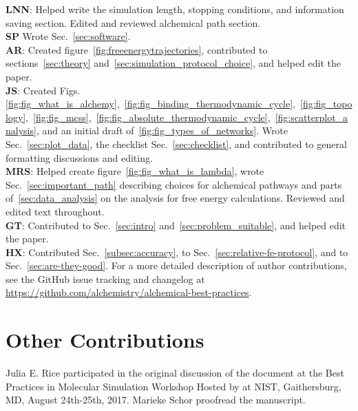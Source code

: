 \documentclass[9pt,bestpractices,pubversion]{livecoms}
\newcommand{\githubrepository}{\url{https://github.com/alchemistry/alchemical-best-practices}} %
\begin{document}
\textbf{LNN}: Helped write the simulation length, stopping conditions, and information saving section. Edited and reviewed alchemical path section.\\
\textbf{SP} Wrote Sec.~\ref{sec:software}. \\
\textbf{AR}: Created figure~\ref{fig:freeenergytrajectories}, contributed to sections~\ref{sec:theory} and~\ref{sec:simulation_protocol_choice}, and helped edit the paper.\\
\textbf{JS}: Created Figs.~ \ref{fig:fig_what_is_alchemy},~\ref{fig:fig_binding_thermodynamic_cycle},~\ref{fig:fig_topology},~\ref{fig:fig_mcss},~\ref{fig:fig_absolute_thermodynamic_cycle},~\ref{fig:scatterplot_analysis}, and an initial draft of~\ref{fig:fig_types_of_networks}. Wrote Sec.~\ref{sec:plot_data}, the checklist Sec.~\ref{sec:checklist}, and contributed to general formatting discussions and editing.\\
\textbf{MRS}: Helped create figure~\ref{fig:fig_what_is_lambda}, wrote Sec.~\ref{sec:important_path} describing choices for alchemical pathways and parts of~\ref{sec:data_analysis} on the analysis for free energy calculations. Reviewed and edited text throughout.\\
\textbf{GT}: Contributed to Sec.~\ref{sec:intro} and~\ref{sec:problem_suitable}, and helped edit the paper.\\
\textbf{HX}: Contributed Sec.~\ref{subsec:accuracy}, to Sec.~\ref{sec:relative-fe-protocol}, and to Sec.~\ref{sec:are-they-good}.
For a more detailed description of author contributions,
see the GitHub issue tracking and changelog at \githubrepository.

\section*{Other Contributions}
%
Julia E. Rice participated in the original discussion of the document at the Best Practices in Molecular Simulation Workshop Hosted by at NIST, Gaithersburg, MD, August 24th-25th, 2017.
Marieke Schor proofread the manuscript. 
\end{document}
